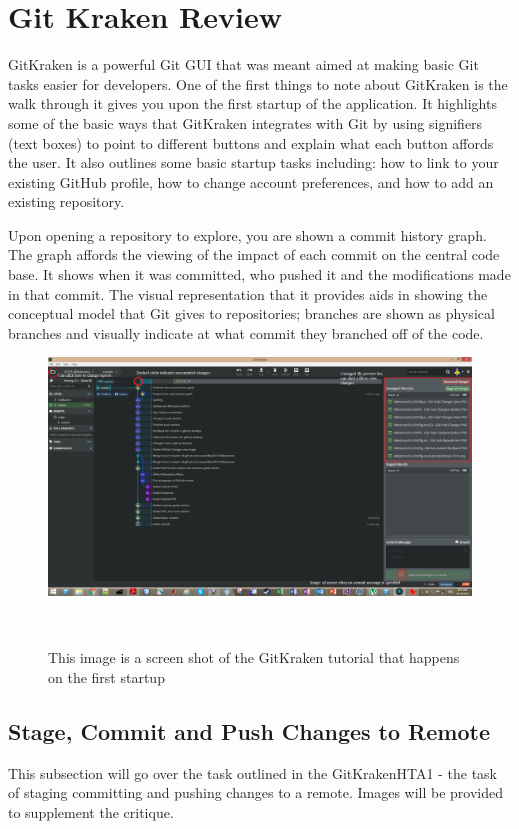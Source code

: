 \documentclass{sigchi}
\begin{document}
\section{Git Kraken Review}
GitKraken is a powerful Git GUI that was meant aimed at making basic Git tasks easier for developers.
One of the first things to note about GitKraken is the walk through it gives you upon the
first startup of the application. It highlights some of the basic ways that GitKraken integrates with Git by
using signifiers (text boxes) to point to different buttons and explain what each button affords the user.
It also outlines some basic startup tasks including: how to link to your existing GitHub profile, how to change
account preferences, and how to add an existing repository.

Upon opening a repository to explore, you are shown a commit history graph. The graph affords the viewing of 
the impact of each commit on the central code base. It shows when it was committed, who pushed it and
the modifications made in that commit. The visual representation that it provides aids in showing the 
conceptual model that Git gives to repositories; branches are shown as physical branches and visually indicate
at what commit they branched off of the code.

\begin{figure}
  \centering
  \includegraphics[width=1.75\columnwidth]{figures/GitKraken/ScreenshotHighlighted}
  \caption{This image is a screen shot of the GitKraken tutorial that happens on the first startup}~\label{fig:figure2}
\end{figure}

\subsection{Stage, Commit and Push Changes to Remote}
This subsection will go over the task outlined in the GitKrakenHTA1 - the task of staging committing 
and pushing changes to a remote. Images will be provided to supplement the critique. 
\end{document}

